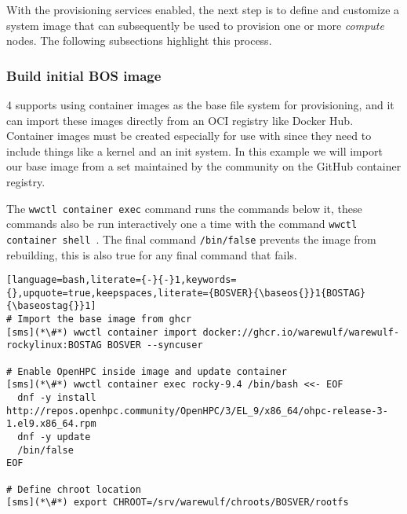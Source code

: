 With the provisioning services enabled, the next step is to define and
customize a system image that can subsequently be used to provision one or more
{\em compute} nodes. The following subsections highlight this process.

\subsubsection{Build initial BOS image} \label{sec:assemble_bos}
\Warewulf{} 4 supports using container images as the base file system for 
provisioning, and it can import these images directly from an OCI registry like
Docker Hub. Container images must be created especially for use with \Warewulf{}
since they need to include things like a kernel and an init system. In this 
example we will import our base image from a set maintained by the \Warewulf{}
community on the GitHub container registry.

The \texttt{wwctl container exec} command runs the commands below it, these commands 
also be run interactively one a time with the command \texttt{wwctl container 
shell \baseos{}}. The final command \texttt{/bin/false} prevents the image from
rebuilding, this is also true for any final command that fails.

\begin{lstlisting}[language=bash,literate={-}{-}1,keywords={},upquote=true,keepspaces,literate={BOSVER}{\baseos{}}1{BOSTAG}{\baseostag{}}1]
# Import the base image from ghcr
[sms](*\#*) wwctl container import docker://ghcr.io/warewulf/warewulf-rockylinux:BOSTAG BOSVER --syncuser

# Enable OpenHPC inside image and update container
[sms](*\#*) wwctl container exec rocky-9.4 /bin/bash <<- EOF
  dnf -y install http://repos.openhpc.community/OpenHPC/3/EL_9/x86_64/ohpc-release-3-1.el9.x86_64.rpm
  dnf -y update
  /bin/false
EOF

# Define chroot location 
[sms](*\#*) export CHROOT=/srv/warewulf/chroots/BOSVER/rootfs
\end{lstlisting}
